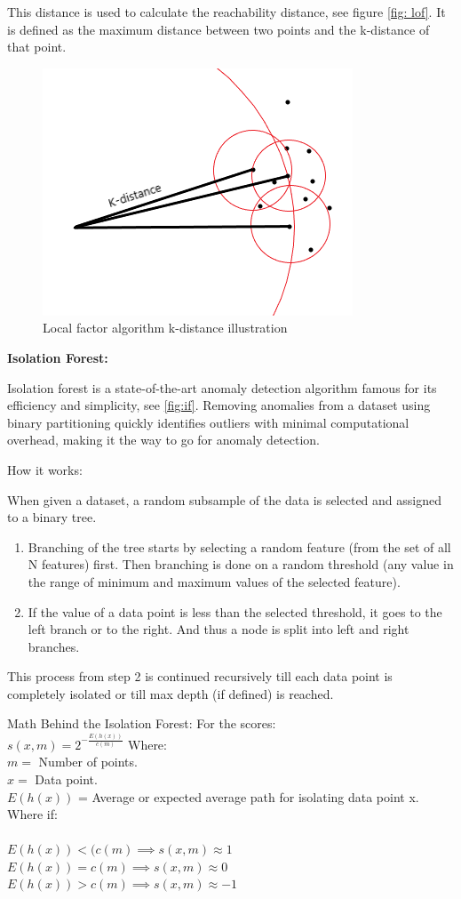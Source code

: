 \documentclass[12pt]{report}
\begin{document}
 This distance is used to calculate the reachability distance, see figure \ref{fig: lof}. It is defined as the maximum distance between two points and the k-distance of that point.
 \begin{figure}[h]
    \includegraphics[width=0.5\linewidth]{lof.png}
    \caption{Local factor  algorithm k-distance illustration}
    \label{fig:lof}
\end{figure}
\clearpage
\item  \textbf{Isolation Forest:}
\par
Isolation forest is a state-of-the-art anomaly detection algorithm famous for its efficiency and simplicity, see \ref{fig:if}. Removing anomalies from a dataset using binary partitioning quickly identifies outliers with minimal computational overhead, making it the way to go for anomaly detection.
\par
How  it  works: \\
\par
When given a dataset, a random subsample of the data is selected and assigned to a binary tree.
\begin{enumerate}
    \item Branching of the tree starts by selecting a random feature (from the set of all N features) first. Then branching is done on a random threshold (any value in the range of minimum and maximum values of the selected feature).

\item  If the value of a data point is less than the selected threshold, it goes to the left branch or to the right. And thus a node is split into left and right branches.
\end{enumerate}
\par
 This process from step 2 is continued recursively till each data point is completely isolated or till max depth (if defined) is reached.
 \par 
 Math Behind the  Isolation Forest: 
 For  the  scores: \\ 
 $ s(x,m)  = 2^{-{\frac{E(h(x))}{c(m)}}} $
 Where: \\ 
 $ m = $ Number of points. \\ 
$ x  = $ Data point.  \\
$ E(h(x)) $ = Average or expected average path for isolating data point x. \\
Where  if:\\
\\
$E(h(x)) <  (c(m)  \implies s(x,m) \approx 1 $ \\
$E(h(x))   = c(m) \implies s(x,m) \approx 0 $ \\
$E(h(x)) > c(m) \implies s(x,m) \approx -1 $\\
\end{document}
